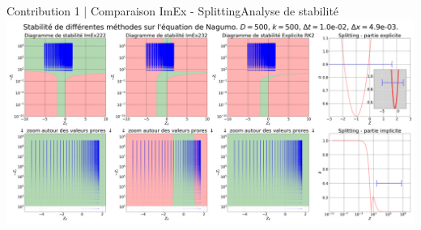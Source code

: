 \begin{frame}{Contribution 1 | Comparaison ImEx - Splitting}{Analyse de stabilité}
    \includegraphics[width = \textwidth]{medias/2_/1_/STABILITE_D500_k500_dt1.0e-02_dx4.9e-03.png}
\end{frame}